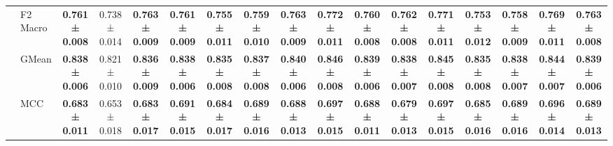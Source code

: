 \begin{table}[H]
{\begin{tabular}{llccccccccccccccc}
 & F2 Macro & \textbf{0.761 ± 0.008} & 0.738 ± 0.014 & \textbf{0.763 ± 0.009} & \textbf{0.761 ± 0.009} & \textbf{0.755 ± 0.011} & \textbf{0.759 ± 0.010} & \textbf{0.763 ± 0.009} & \textbf{0.772 ± 0.011} & \textbf{0.760 ± 0.008} & \textbf{0.762 ± 0.008} & \textbf{0.771 ± 0.011} & \textbf{0.753 ± 0.012} & \textbf{0.758 ± 0.009} & \textbf{0.769 ± 0.011} & \textbf{0.763 ± 0.008} \\
 & GMean & \textbf{0.838 ± 0.006} & 0.821 ± 0.010 & \textbf{0.836 ± 0.009} & \textbf{0.838 ± 0.006} & \textbf{0.835 ± 0.008} & \textbf{0.837 ± 0.008} & \textbf{0.840 ± 0.006} & \textbf{0.846 ± 0.008} & \textbf{0.839 ± 0.006} & \textbf{0.838 ± 0.007} & \textbf{0.845 ± 0.008} & \textbf{0.835 ± 0.008} & \textbf{0.838 ± 0.007} & \textbf{0.844 ± 0.007} & \textbf{0.839 ± 0.006} \\
 & MCC & \textbf{0.683 ± 0.011} & 0.653 ± 0.018 & \textbf{0.683 ± 0.017} & \textbf{0.691 ± 0.015} & \textbf{0.684 ± 0.017} & \textbf{0.689 ± 0.016} & \textbf{0.688 ± 0.013} & \textbf{0.697 ± 0.015} & \textbf{0.688 ± 0.011} & \textbf{0.679 ± 0.013} & \textbf{0.697 ± 0.015} & \textbf{0.685 ± 0.016} & \textbf{0.689 ± 0.016} & \textbf{0.696 ± 0.014} & \textbf{0.689 ± 0.013} \\
\cline{1-17}
\bottomrule
\end{tabular}
    }
\end{table}
